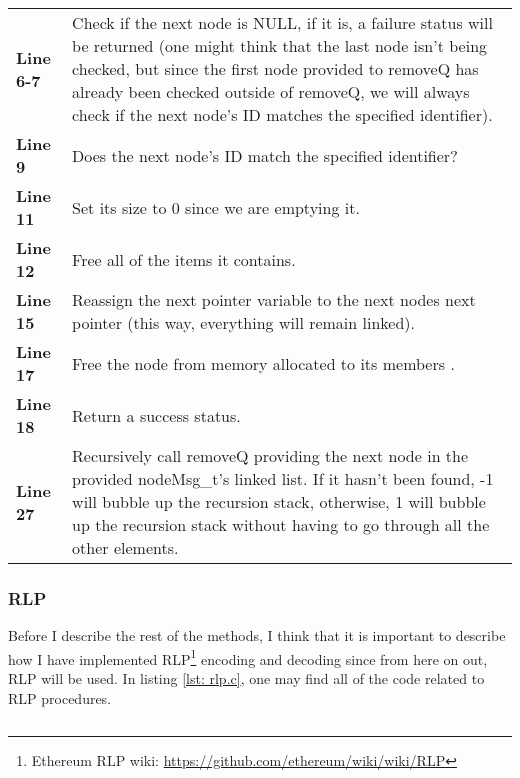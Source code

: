 \documentclass[a4paper, 12pt, titlepage]{article}
\newenvironment{code}{\captionsetup{type=listing}}{}
\newcommand{\sourcecode}[3]{
    \begin{code}
      \inputminted[linenos,numbersep=5pt,gobble=0,frame=lines,framesep=2mm,]{c}{#1}
        \caption{#2}
        \label{lst: #3}
    \end{code}
}
\begin{document}
\begin{onehalfspacing}
  \clearpage

   \sourcecode{snippets/task2b/removeQ.c}{removeQ helper function}{removeQ}

   \begin{longtable}{l p{10cm}}
    \textbf{Line 6-7} & Check if the next node is NULL, if it is, a failure status will be returned (one might think that the last node isn't being checked, but since the first node provided to removeQ has already been checked outside of removeQ, we will always check if the next node's ID matches the specified identifier). \\
    \textbf{Line 9} & Does the next node's ID match the specified identifier? \\
    \textbf{Line 11} &  Set its size to 0 since we are emptying it. \\
    \textbf{Line 12} & Free all of the items it contains. \\
    \textbf{Line 15} & Reassign the next pointer variable to the next nodes next pointer (this way, everything will remain linked).\\
    \textbf{Line 17} & Free the node from  memory allocated to its members . \\
    \textbf{Line 18} & Return a success status. \\
    \textbf{Line 27} & Recursively call removeQ providing the next node in the provided nodeMsg\_t's linked list. If it hasn't been found, -1 will bubble up the recursion stack, otherwise, 1 will bubble up the recursion stack without having to go through all the other elements. \\
  \end{longtable}

  \clearpage

  \subsubsection{RLP}
  Before I describe the rest of the methods, I think that it is important to describe how I have implemented RLP\footnote{Ethereum RLP wiki: \url{https://github.com/ethereum/wiki/wiki/RLP}} encoding and decoding since from here on out, RLP will be used. In listing \ref{lst: rlp.c}, one may find all of the code related to RLP procedures.

  \sourcecode{snippets/task2b/rlp.c}{RLP Implementation}{rlp.c}


\end{onehalfspacing}
\end{document}
